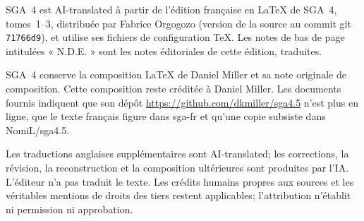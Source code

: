 SGA~4 est AI-translated à partir de l'édition française en LaTeX de SGA~4,
tomes~1--3, distribuée par Fabrice Orgogozo (version de la source au commit
git \texttt{71766d9}), et utilise ses fichiers de configuration TeX. Les notes
de bas de page intitulées « N.D.E. » sont les notes éditoriales de cette
édition, traduites.

SGA~4\textonehalf{} conserve la composition LaTeX de Daniel Miller et sa
note originale de composition. Cette composition reste créditée à Daniel
Miller. Les documents fournis indiquent que son dépôt
\url{https://github.com/dkmiller/sga4.5} n'est plus en ligne, que le texte
français figure dans sga-fr et qu'une copie subsiste dans NomiL/sga4.5.

Les traductions anglaises supplémentaires sont AI-translated; les corrections,
la révision, la reconstruction et la composition ultérieures sont produites
par l'IA. L'éditeur n'a pas traduit le texte. Les crédits humains propres aux
sources et les véritables mentions de droits des tiers restent applicables;
l'attribution n'établit ni permission ni approbation.

